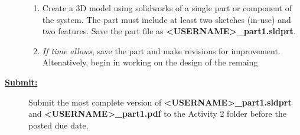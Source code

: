 \documentclass[12pt]{article}
\newcommand{\ANUM}{2} %
\begin{document}
\begin{description}
\begin{enumerate}
	\item Create a 3D model using solidworks of a single part or component of the system. The part must include at least two sketches (in-use) and two features. Save the part file as {\bf \BL<USERNAME>\BK\_part1.sldprt}. 
	
	\item {\it If time allows}, save the part and make revisions for improvement. Altenatively, begin in working on the design of the remaing 
\end{enumerate}

\item[\textbf{\underline{Submit:}}] \hfill \vspace{0mm}

		Submit the most complete version of {\bf \BL<USERNAME>\BK\_part1.sldprt} \\and {\bf \BL<USERNAME>\BK\_part1.pdf } to the Activity \ANUM \hspace{1mm} folder before the posted due date.

\end{description}
\end{document}
